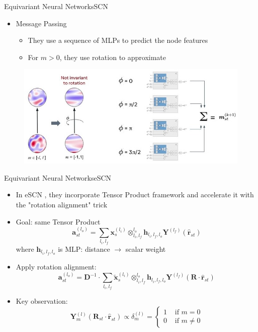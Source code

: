 \documentclass[pdf,serif]{beamer}
\begin{document}
\begin{frame}{Equivariant Neural Networks}{SCN}
    \begin{itemize}
        \item Message Passing
        \begin{itemize}
            \item They use a sequence of MLPs to predict the node features 
            \item For $m>0$, they use rotation to approximate
        \end{itemize}
    \end{itemize}
    \vspace*{1em}
    \begin{figure}
        \includegraphics[width=.9\linewidth]{images/rot4}
    \end{figure}
\end{frame}

\begin{frame}{Equivariant Neural Networks}{eSCN}
    \begin{itemize}
        \item In eSCN \citep{Passaro2023ReducingSC}, they incorporate Tensor Product framework and accelerate it with the "rotation alignment" trick
        \item Goal: same Tensor Product
        $$
        \mathbf{a}_{s t}^{\left(l_o\right)}=\sum_{l_i, l_f} \mathbf{x}_s^{\left(l_i\right)} \otimes_{l_i, l_f}^{l_o} \mathbf{h}_{l_i, l_f, l_o} \mathbf{Y}^{\left(l_f\right)}\left(\hat{\mathbf{r}}_{s t}\right)
        $$
        where $\mathbf{h}_{l_i, l_f, l_o}$ is MLP: distance $\to$ scalar weight
        \item Apply rotation alignment:
        $$
        \mathbf{a}_{s t}^{\left(l_o\right)}=\mathbf{D}^{-1} \cdot \sum_{l_i, l_f} \tilde{\mathbf{x}}_s^{\left(l_i\right)} \otimes_{l_i, l_f}^{l_o} \mathbf{h}_{l_i, l_f, l_o} \mathbf{Y}^{\left(l_f\right)}\left(\mathbf{R} \cdot \hat{\mathbf{r}}_{s t}\right)
        $$
        \item Key observation:
        $$
        \mathbf{Y}_m^{(l)}\left(\mathbf{R}_{s t} \cdot \hat{\mathbf{r}}_{s t}\right) \propto \delta_m^{(l)}= \begin{cases}1 & \text { if } m=0 \\ 0 & \text { if } m \neq 0\end{cases}
        $$
    \end{itemize}
\end{frame}
\end{document}
